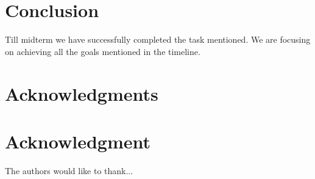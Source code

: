 \documentclass[conference,compsoc]{IEEEtran}
\begin{document}
\section{Conclusion}
Till midterm we have successfully completed the task mentioned. We are focusing on achieving all the goals mentioned in the timeline.






\ifCLASSOPTIONcompsoc
  \section*{Acknowledgments}
\else
  \section*{Acknowledgment}
\fi


The authors would like to thank...


{}
\end{document}
